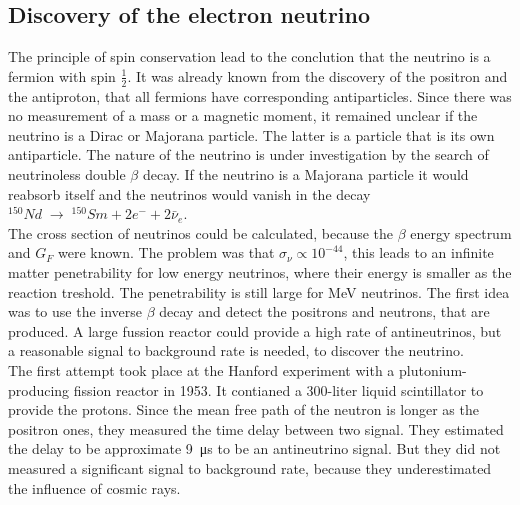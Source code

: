 \subsection{Discovery of the electron neutrino}
The principle of spin conservation lead to the conclution that the neutrino is a fermion with spin $\frac{1}{2}$. It was already known from the discovery of the positron and the antiproton, that all fermions have corresponding antiparticles. Since there was no measurement of a mass or a magnetic moment, it remained unclear if the neutrino is a Dirac or Majorana particle. The latter is a particle that is its own antiparticle. The nature of the neutrino is under investigation by the search of neutrinoless double $\beta$ decay. If the neutrino is a Majorana particle it would reabsorb itself and the neutrinos would vanish in the decay $^{150}Nd \; \rightarrow \; ^{150}Sm + 2 e^{-} + 2 \bar{\nu}_e$.\\
The cross section of neutrinos could be calculated, because the $\beta$ energy spectrum and $G_F$ were known. The problem was that $\sigma_{\nu} \propto 10^{-44}$, this leads to an infinite matter penetrability for low energy neutrinos, where their energy is smaller as the reaction treshold. The penetrability is still large for \si{\mega\electronvolt} neutrinos. The first idea was to use the inverse $\beta$ decay and detect the positrons and neutrons, that are produced. A large fussion reactor could provide a high rate of antineutrinos, but a reasonable signal to background rate is needed, to discover the neutrino.\\
The first attempt took place at the Hanford experiment with a plutonium-producing fission reactor in 1953. It contianed a 300-liter liquid scintillator to provide the protons. Since the mean free path of the neutron is longer as the positron ones, they measured the time delay between two signal. They estimated the delay to be approximate \SI{9}{\micro\second} to be an antineutrino signal. But they did not measured a significant signal to background rate, because they underestimated the influence of cosmic rays.\\
